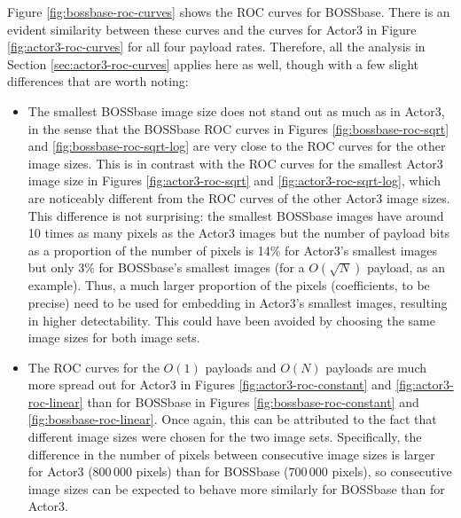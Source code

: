 \documentclass[11pt,a4paper,twoside,openright]{report}
\begin{document}
Figure \ref{fig:bossbase-roc-curves} shows the ROC curves for BOSSbase. There is an evident similarity between these curves and the curves for Actor3 in Figure \ref{fig:actor3-roc-curves} for all four payload rates. Therefore, all the analysis in Section \ref{sec:actor3-roc-curves} applies here as well, though with a few slight differences that are worth noting:
\begin{itemize}
	\item The smallest BOSSbase image size does not stand out as much as in Actor3, in the sense that the BOSSbase ROC curves in Figures \ref{fig:bossbase-roc-sqrt} and \ref{fig:bossbase-roc-sqrt-log} are very close to the ROC curves for the other image sizes. This is in contrast with the ROC curves for the smallest Actor3 image size in Figures \ref{fig:actor3-roc-sqrt} and \ref{fig:actor3-roc-sqrt-log}, which are noticeably different from the ROC curves of the other Actor3 image sizes. This difference is not surprising: the smallest BOSSbase images have around 10 times as many pixels as the Actor3 images but the number of payload bits as a proportion of the number of pixels is 14\% for Actor3's smallest images but only 3\% for BOSSbase's smallest images (for a $O(\sqrt{N})$ payload, as an example). Thus, a much larger proportion of the pixels (coefficients, to be precise) need to be used for embedding in Actor3's smallest images, resulting in higher detectability. This could have been avoided by choosing the same image sizes for both image sets.
	\item The ROC curves for the $O(1)$ payloads and $O(N)$ payloads are much more spread out for Actor3 in Figures \ref{fig:actor3-roc-constant} and \ref{fig:actor3-roc-linear} than for BOSSbase in Figures \ref{fig:bossbase-roc-constant} and \ref{fig:bossbase-roc-linear}. Once again, this can be attributed to the fact that different image sizes were chosen for the two image sets. Specifically, the difference in the number of pixels between consecutive image sizes is larger for Actor3 ($800\,000$ pixels) than for BOSSbase ($700\,000$ pixels), so consecutive image sizes can be expected to behave more similarly for BOSSbase than for Actor3.
\end{itemize}
\end{document}
